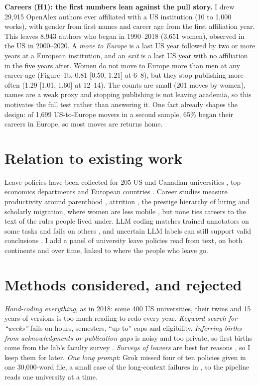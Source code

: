 \documentclass[10pt,twocolumn]{article}
\begin{document}
\textbf{Careers (H1): the first numbers lean against the pull story.} I drew 29,915 OpenAlex authors ever affiliated with a US institution (10 to 1,000 works), with gender from first names \citep[binary, 37.5\% not gendered;][]{genderguesser} and career age from the first affiliation year. This leaves 8,943 authors who began in 1990--2018 (3,651 women), observed in the US in 2000--2020. A \emph{move to Europe} is a last US year followed by two or more years at a European institution, and an \emph{exit} is a last US year with no affiliation in the five years after. Women do not move to Europe more than men at any career age (Figure~1b, 0.81 [0.50, 1.21] at 6--8), but they stop publishing more often (1.29 [1.01, 1.60] at 12--14). The counts are small (201 moves by women), names are a weak proxy and stopping publishing is not leaving academia, so this motivates the full test rather than answering it. One fact already shapes the design: of 1,699 US-to-Europe movers in a second sample, 65\% began their careers in Europe, so most moves are returns home.

\section{Relation to existing work}
Leave policies have been collected for 205 US and Canadian universities \citep{morgan2018}, top economics departments \citep{antecol2018} and European countries \citep{spitzer2026}. Career studies measure productivity around parenthood \citep{morgan2021}, attrition \citep{spoon2023}, the prestige hierarchy of hiring \citep{wapman2022} and scholarly migration, where women are less mobile \citep{zhao2023}, but none ties careers to the text of the rules people lived under. LLM coding matches trained annotators on some tasks and fails on others \citep{bamman2024,than2025}, and uncertain LLM labels can still support valid conclusions \citep{gligoric2025}. I add a panel of university leave policies read from text, on both continents and over time, linked to where the people who leave go.

\section{Methods considered, and rejected}
\emph{Hand-coding everything}, as in 2018: some 400 US universities, their twins and 15 years of versions is too much reading to redo every year. \emph{Keyword search for ``weeks''} fails on hours, semesters, ``up to'' caps and eligibility. \emph{Inferring births from acknowledgments or publication gaps} is noisy and too private, so first births come from the lab's faculty survey \citep{morgan2021}. \emph{Surveys of leavers} are best for reasons \citep{spoon2023}, so I keep them for later. \emph{One long prompt}: Grok missed four of ten policies given in one 30,000-word file, a small case of the long-context failures in \citet{karpinska2024}, so the pipeline reads one university at a time.
\end{document}
